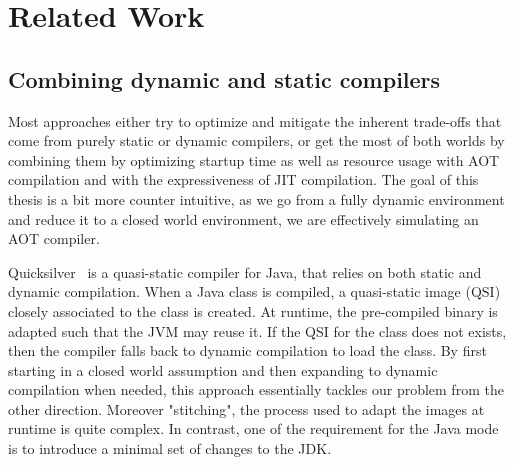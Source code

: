 \chapter{Related Work}

\section{Combining dynamic and static compilers}
Most approaches either try to optimize and mitigate the inherent trade-offs that come from purely static or dynamic compilers, or get the most of both worlds by combining them by optimizing startup time as well as resource usage with AOT compilation and with the expressiveness of JIT compilation.
The goal of this thesis is a bit more counter intuitive, as we go from a fully dynamic environment and reduce it to a closed world environment, we are effectively simulating an AOT compiler.

Quicksilver~\cite{serrano_quicksilver_2000} is a quasi-static compiler for Java, that relies on both static and dynamic compilation. 
When a Java class is compiled, a quasi-static image (QSI) closely associated to the class is created. At runtime, the pre-compiled binary is adapted such that the JVM may reuse it. If the QSI for the class does not exists, then the compiler falls back to dynamic compilation to load the class. 
By first starting in a closed world assumption and then expanding to dynamic compilation when needed, this approach essentially tackles our problem from the other direction.
Moreover "stitching", the process used to adapt the images at runtime is quite complex. In contrast, one of the requirement for the Java mode is to introduce a minimal set of changes to the JDK.

